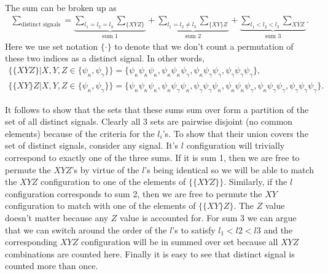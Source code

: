 \documentclass[11pt]{article} %
\begin{document}
The sum can be broken up as
\begin{gather*}
    \sum_{\text{distinct signals}} = \underbrace{\sum_{l_1=l_2=l_3}\sum_{\{XYZ\}}}_{\text{sum }1} + \underbrace{\sum_{l_1=l_2\neq l_3}\sum_{\{XY\}Z}}_{\text{sum }2} + \underbrace{\sum_{l_1<l_2<l_3}\sum_{XYZ}}_{\text{sum }3}.
\end{gather*}
Here we use set notation $\{\cdot\}$ to denote that we don't count a permutation of these two indices as a distinct signal. In other words,
\begin{gather*}
    \{\{XYZ\}|X,Y,Z\in\{\psi_\kappa, \psi_\gamma\}\} = \{\psi_\kappa\psi_\kappa\psi_\kappa, \psi_\kappa\psi_\kappa\psi_\gamma, \psi_\kappa\psi_\gamma\psi_\gamma, \psi_\gamma\psi_\gamma\psi_\gamma\}, \\
    \{\{XY\}Z|X,Y,Z\in\{\psi_\kappa, \psi_\gamma\}\} = \{\psi_\kappa\psi_\kappa\psi_\kappa, \psi_\kappa\psi_\gamma\psi_\kappa, \psi_\gamma\psi_\gamma\psi_\kappa,\psi_\kappa\psi_\kappa\psi_\gamma, \psi_\kappa\psi_\gamma\psi_\gamma, \psi_\gamma\psi_\gamma\psi_\gamma\}.
\end{gather*}

It follows to show that the sets that these sums sum over form a partition of the set of all distinct signals. Clearly all 3 sets are pairwise disjoint (no common elements) because of the criteria for the $l_i$'s. To show that their union covers the set of distinct signals, consider any signal. It's $l$ configuration will trivially correspond to exactly one of the three sums. If it is sum 1, then we are free to permute the $XYZ$'s by virtue of the $l$'s being identical so we will be able to match the $XYZ$ configuration to one of the elements of $\{\{XYZ\}\}$. Similarly, if the $l$ configuration corresponds to sum 2, then we are free to permute the $XY$ configuration to match with one of the elements of $\{\{XY\}Z\}$. The $Z$ value doesn't matter because any $Z$ value is accounted for. For sum 3 we can argue that we can switch around the order of the $l$'s to satisfy $l_1 < l2 < l3$ and the corresponding $XYZ$ configuration will be in summed over set because all $XYZ$ combinations are counted here. Finally it is easy to see that distinct signal is counted more than once.
\end{document}
